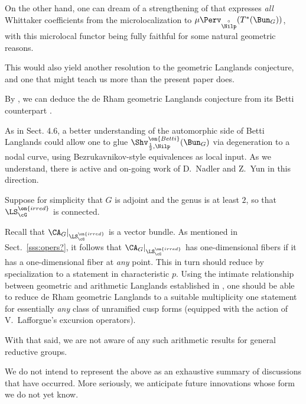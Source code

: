 \documentclass[9pt]{amsart}
\theoremstyle{remark}
\theoremstyle{definition}
\theoremstyle{remark}
\newcommand{\secref}[1]{Sect.~\ref{#1}}
\numberwithin{equation}{section}
\begin{document}
\medskip 

On the other hand, one can dream of a strengthening of \cite{NT} that expresses
\emph{all} Whittaker coefficients from the microlocalization to 
$\mu\Perv_{\overset{\circ}{\Nilp}}(T^*(\Bun_G))$, with this microlocal functor 
being fully faithful for some natural geometric reasons. 

\medskip

This would also yield another resolution to the geometric 
Langlands conjecture, and one that might teach us more than
the present paper does. 


By \cite[Theorem 3.5.6]{GLC1}, we can deduce the de Rham geometric Langlands conjecture from 
its Betti counterpart \cite{BZN}.

\medskip 

As in \cite{BZN} Sect. 4.6, a better understanding of the automorphic side of 
Betti Langlands could allow one to glue $\Shv_{\frac{1}{2},\Nilp}^{\on{Betti}}(\Bun_G)$
via degeneration to a nodal curve, using Bezrukavnikov-style equivalences as local input. 
As we understand, there is active and on-going work of D.~Nadler and Z.~Yun in this direction.


Suppose for simplicity that $G$ is adjoint and the genus is at least $2$,
so that $\LS_{\cG}^{\on{irred}}$ is connected. 

\medskip 

Recall that $\CA_G|_{\LS_\cG^{\on{irred}}}$ is a vector bundle. 
As mentioned in \secref{sss:opers?}, it follows 
that $\CA_G|_{\LS_\cG^{\on{irred}}}$ has one-dimensional fibers if it has
a one-dimensional fiber at \emph{any} point.
This in turn should reduce by specialization to a statement in characteristic $p$. Using
the intimate relationship between geometric and arithmetic Langlands established
in \cite{AGKRRV3}, one should be able to reduce de Rham geometric Langlands to 
a suitable multiplicity one statement for 
essentially \emph{any} class of unramified cusp forms
(equipped with the action of V.~Lafforgue's excursion operators).

\medskip 

With that said, we are not aware of any such arithmetic results for general reductive groups. 



We do not intend to represent the above as 
an exhaustive summary of discussions that have occurred. More seriously, we anticipate
future innovations whose form we do not yet know. 
\end{document}
